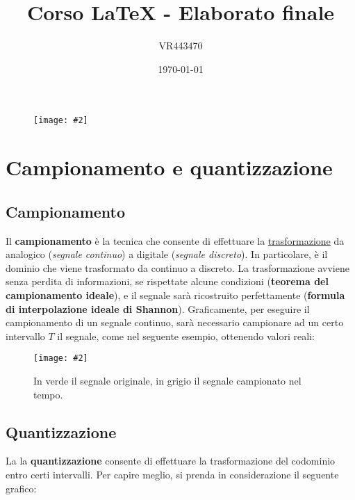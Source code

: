 \documentclass[a4paper]{article}
\newcommand{\customimg}[2]{\texttt{[image: \#2]}}
\begin{document}
	\begin{figure}
		\centering
		\customimg{0.3}{img/logo-univr.jpg}
		\label{img-univr}
	\end{figure}

	\author{VR443470}
	\title{Corso \LaTeX{} - Elaborato finale}
	\date{\printdayoff\today}
	\maketitle
	
	\newpage
	
	\tableofcontents
	
	\newpage
	
	\section{Campionamento e quantizzazione}
	
	\subsection{Campionamento}
	
	Il \textbf{campionamento} è la tecnica che consente di effettuare la \underline{trasformazione} da analogico (\emph{segnale continuo}) a digitale (\emph{segnale discreto}). In particolare, è il dominio che viene trasformato da continuo a discreto.
	La trasformazione avviene senza perdita di informazioni, se rispettate alcune condizioni (\textbf{teorema del campionamento ideale}), e il segnale sarà ricostruito perfettamente (\textbf{formula di interpolazione ideale di Shannon}).
	Graficamente, per eseguire il campionamento di un segnale continuo, sarà necessario campionare ad un certo intervallo $T$ il segnale, come nel seguente esempio, ottenendo valori reali:
	
	\begin{figure}[!htp]
		\centering
		\customimg{0.7}{img/campionamento.pdf}
		\caption{In verde il segnale originale, in grigio il segnale campionato nel tempo.}
		\label{img-camp_esempio}
	\end{figure}
	
	\subsection{Quantizzazione}
	
	La la \textbf{quantizzazione} consente di effettuare la trasformazione del codominio entro certi intervalli. Per capire meglio, si prenda in considerazione il seguente grafico:
	
\end{document}
